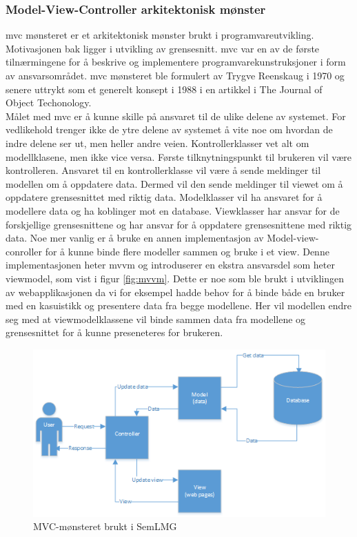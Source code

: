 \subsubsection{Model-View-Controller arkitektonisk mønster}
\label{chap:mvc}
\gls{mvc} mønsteret er et arkitektonisk mønster brukt i programvareutvikling. Motivasjonen bak ligger i utvikling av grensesnitt. \gls{mvc} var en av de første tilnærmingene for å beskrive og implementere programvarekunstruksjoner i form av ansvarsområdet. \gls{mvc} mønsteret ble formulert av Trygve Reenskaug i 1970 og senere uttrykt som et generelt konsept i 1988 i en artikkel i The Journal of Object Techonology. \\
Målet med \gls{mvc} er å kunne skille på ansvaret til de ulike delene av systemet. For vedlikehold trenger ikke de ytre delene av systemet å vite noe om hvordan de indre delene ser ut, men heller andre veien. Kontrollerklasser vet alt om modellklasene, men ikke vice versa. Første tilknytningspunkt til brukeren vil være kontrolleren. Ansvaret til en kontrollerklasse vil være å sende meldinger til modellen om å oppdatere data. Dermed vil den sende meldinger til viewet om å oppdatere grensesnittet med riktig data. Modelklasser vil ha ansvaret for å modellere data og ha koblinger mot en database. Viewklasser har ansvar for de forskjellige grensesnittene og har ansvar for å oppdatere grensesnittene med riktig data.
Noe mer vanlig er å bruke en annen implementasjon av Model-view-conroller for å kunne binde flere modeller sammen og bruke i et view. Denne implementasjonen heter \gls{mvvm} og introduserer en ekstra ansvarsdel som heter viewmodel, som vist i figur \ref{fig:mvvm}. Dette er noe som ble brukt i utviklingen av webapplikasjonen da vi for eksempel hadde behov for å binde både en bruker med en kasuistikk og presentere data fra begge modellene. Her vil modellen endre seg med at viewmodelklassene vil binde sammen data fra modellene og grensesnittet for å kunne preseneteres for brukeren.
\begin{figure}[H]
\centering
\includegraphics[width=14cm]{images/mvc}
\caption{MVC-mønsteret brukt i SemLMG}
\label{fig:mvc}
\end{figure}

